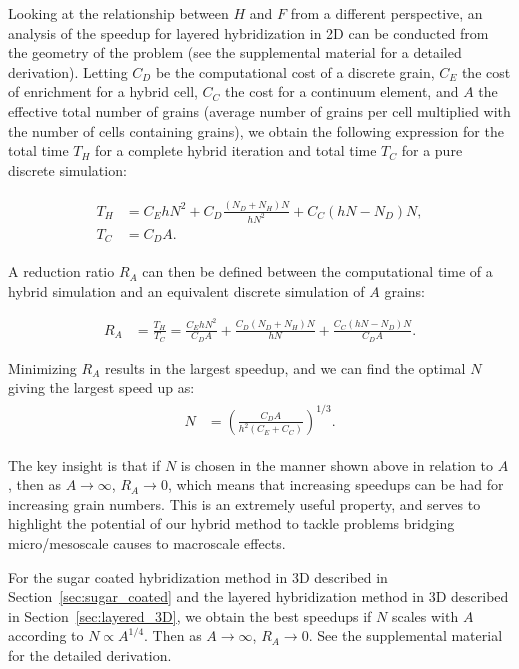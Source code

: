 Looking at the relationship between $H$ and $F$ from a different perspective, an analysis of the speedup for layered hybridization in 2D can be conducted from the geometry of the problem (see the supplemental material for a detailed derivation). Letting $C_D$ be the computational cost
of a discrete grain, $C_E$ the cost of enrichment for a hybrid cell, $C_C$ the cost for a continuum element, and $A$ the effective total number of grains (average number of grains per 
cell multiplied with the number of cells containing grains), we obtain the following expression for the total time $T_H$ for a complete hybrid iteration and total time $T_C$ for a pure discrete simulation:

\begin{align}
\begin{aligned}
T_H &= C_EhN^2 +C_D\frac{(N_D+N_H)N}{hN^2}+C_C(hN-N_D)N , \\
T_C &= C_DA.
\end{aligned}
\end{align}

A reduction ratio $R_A$ can then be defined between the computational time of a hybrid simulation and an equivalent discrete simulation of $A$ grains:

\begin{align}
R_A &=\frac{T_H}{T_C}=\frac{C_E h N^2}{C_DA} +\frac{C_D (N_D+N_H)N}{hN}+\frac{C_C (hN-N_D)N}{C_DA}.
\end{align}

Minimizing $R_A$ results in the largest speedup, 
and we can find the optimal $N$ giving the largest speed up as:
\begin{align}
\begin{aligned}
N & = \left(\frac{C_DA}{h^2(C_E+C_C)}\right)^{1/3}.
\end{aligned}
\end{align}

The key insight is that if $N$ is chosen in the manner shown above in relation to $A$, then as $A\rightarrow\infty$, $R_A\rightarrow0$, which means that increasing speedups
can be had for increasing grain numbers. This is an extremely useful property, and serves to highlight the potential of our hybrid method to tackle problems bridging 
micro/mesoscale causes to macroscale effects. 

For the sugar coated hybridization method in 3D described in Section~\ref{sec:sugar_coated} and the layered hybridization method in 3D described in Section~\ref{sec:layered_3D}, we obtain the best speedups if $N$ scales with $A$ according to $N \propto A^{1/4}$. Then as $A\rightarrow\infty$, $R_A\rightarrow0$. See the supplemental material for the detailed derivation.

